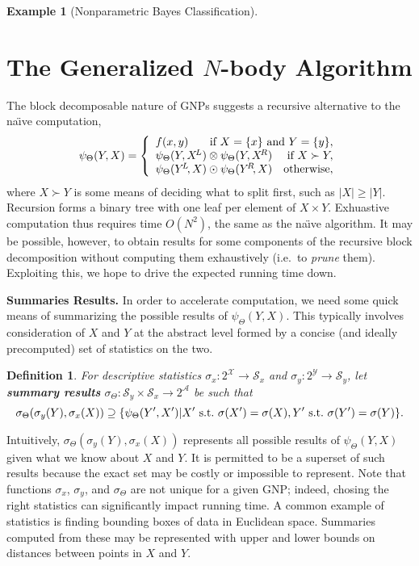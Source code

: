 \documentclass{article}
\newtheorem{definition} {Definition}
\newtheorem{example} {Example}
\newcommand{\GNP}[1][\psi]{{#1}_{\Theta}}
\newcommand{\st}{{\rm~s.t.~}}
\begin{document}
\begin{example}[Nonparametric Bayes Classification]
\end{example}

\section{The Generalized $N$-body Algorithm}

The block decomposable nature of GNPs suggests a recursive alternative
to the na\"{\i}ve computation,
\[
\GNP(Y,X) = \left\{ \begin{array}{lrr}
  f(x,y) & \multicolumn{2}{r}{\mbox{\rm if } X = \{x\} \mbox{ \rm and } Y = \{y\},} \\
  \multicolumn{2}{l}{\GNP(Y,X^{\!L}) \otimes \GNP(Y,X^{\!R})} & \mbox{\rm if } X \succ Y, \\
  \multicolumn{2}{l}{\GNP(Y^{\!L}\!,X) \odot \GNP(Y^{\!R}\!,X)} & \mbox{\rm otherwise},
\end{array} \right.
\]
where $X \succ Y$ is some means of deciding what to split first, such
as $|X| \geq |Y|$.  Recursion forms a binary tree with one leaf per
element of $X \times Y$.  Exhuastive computation thus requires time
$O(N^2)$, the same as the na\"{\i}ve algorithm.  It may be possible,
however, to obtain results for some components of the recursive block
decomposition without computing them exhaustively (i.e.~to {\em prune}
them).  Exploiting this, we hope to drive the expected running time
down.


{\bf Summaries Results.}  In order to accelerate computation, we need
some quick means of summarizing the possible results of $\GNP(Y,X)$.
This typically involves consideration of $X$ and $Y$ at the abstract
level formed by a concise (and ideally precomputed) set of statistics
on the two.
\begin{definition}
  For descriptive statistics $\sigma_x \colon 2^{\mathcal{X}} \to
  \mathcal{S}_x$ and $\sigma_y \colon 2^{\mathcal{Y}} \to
  \mathcal{S}_y$, let {\bf summary results} $\GNP[\sigma] \colon
  \mathcal{S}_y \times \mathcal{S}_x \to 2^\mathcal{A}$ be such that
  \[
  \GNP[\sigma](\sigma_y(Y),\sigma_x(X)) \supseteq \{\GNP(Y',X') | X' \st \sigma(X') = \sigma(X), Y' \st \sigma(Y') = \sigma(Y)\}.
  \]
\end{definition}
\noindent Intuitively, $\GNP[\sigma](\sigma_y(Y),\sigma_x(X))$
represents all possible results of $\GNP(Y,X)$ given what we know
about $X$ and $Y$.  It is permitted to be a superset of such results
because the exact set may be costly or impossible to represent.  Note
that functions $\sigma_x$, $\sigma_y$, and $\GNP[\sigma]$ are not
unique for a given GNP; indeed, chosing the right statistics can
significantly impact running time.  A common example of statistics is
finding bounding boxes of data in Euclidean space.  Summaries computed
from these may be represented with upper and lower bounds on distances
between points in $X$ and $Y$.
\end{document}
